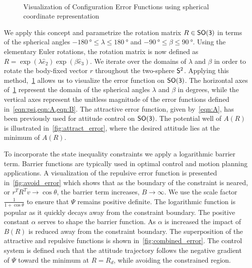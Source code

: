 \documentclass[10pt,fleqn]{IJCAS}  %
\begin{document}
\begin{figure}[H]%
    \centering 
    ~
    ~
    \caption{Visualization of Configuration Error Functions using spherical coordinate representation}
    \label{fig:config_error} 
\end{figure}%
\begin{multicols}{2}
We apply this concept and parametrize the rotation matrix \( R \in \SO \) in terms of the spherical angles \( \SI{-180}{\degree} \leq \lambda \leq \SI{180}{\degree}  \) and \( \SI{-90}{\degree} \leq \beta \leq \SI{90}{\degree} \). 
Using the elementary Euler rotations, the rotation matrix is now defined as \( R = \exp( \lambda \hat{e}_2) \exp( \beta \hat{e}_3) \).
We iterate over the domains of \( \lambda\) and \(\beta\) in order to rotate the body-fixed vector \( r \) throughout the two-sphere \( \S^2 \).
Applying this method,~\cref{fig:config_error} allows us to visualize the error function on \( \SO \).
The horizontal axes of~\cref{fig:config_error} represent the domain of the spherical angles \( \lambda \) and \( \beta \) in degrees, while the vertical axes represent the unitless magnitude of the error functions defined in~\cref{eqn:psi,eqn:A,eqn:B}.
The attractive error function, given by~\cref{eqn:A}, has been previously used for attitude control on \(\SO\).
The potential well of \( A(R)\) is illustrated in~\cref{fig:attract_error}, where the desired attitude lies at the minimum of \( A(R) \).

To incorporate the state inequality constraints we apply a logarithmic barrier term.
Barrier functions are typically used in optimal control and motion planning applications.
A visualization of the repulsive error function is presented in~\cref{fig:avoid_error} which shows that as the boundary of the constraint is neared, or \( r^T R^T v \to \cos \theta \), the barrier term increases, \( B \to \infty\).
We use the scale factor~\(\frac{1}{1+\cos \theta} \) to ensure that \( \Psi \) remains positive definite.
The logarithmic function is popular as it quickly decays away from the constraint boundary.
The positive constant \( \alpha \) serves to shape the barrier function.
As \( \alpha \) is increased the impact of \( B(R) \) is reduced away from the constraint boundary. 
The superposition of the attractive and repulsive functions is shown in~\cref{fig:combined_error}.
The control system is defined such that the attitude trajectory follows the negative gradient of \( \Psi \) toward the minimum at \( R = R_d \), while avoiding the constrained region.


\end{multicols}
\end{document}
